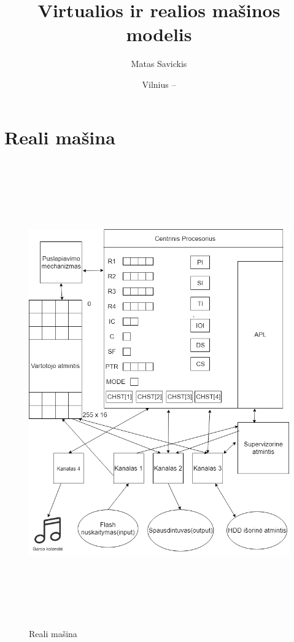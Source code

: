 \documentclass[oneside]{VUMIFPSkursinis}
\title{Virtualios ir realios mašinos modelis}
\author{Matas Savickis}
\date{Vilnius – \the\year}
\begin{document}
\maketitle
\tableofcontents

\section{Reali mašina}
\begin{figure}[H]
		\centering	
	\includegraphics[width=18cm,height=20cm,keepaspectratio]{RealiMasina.png}
	\caption{Reali mašina}
	\label{fig:Reali mašina}
\end{figure}

\pagebreak
\end{document}

